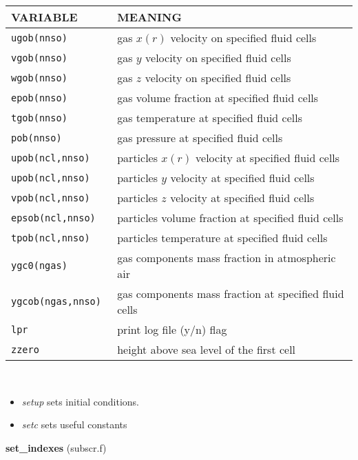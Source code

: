 \begin{tabular}{|p{6cm}|p{6cm}|}\hline
VARIABLE & MEANING\\\hline
\tt ugob(nnso) & gas $x(r)$ velocity on specified fluid cells\\\hline 
\tt vgob(nnso) & gas $y$ velocity on specified fluid cells\\\hline
\tt wgob(nnso) & gas $z$ velocity on specified fluid cells\\\hline
\tt epob(nnso) & gas volume fraction at specified fluid cells\\\hline
\tt  tgob(nnso) & gas temperature at specified fluid cells\\\hline
\tt pob(nnso) & gas pressure at specified fluid cells\\\hline
\tt upob(ncl,nnso) & particles $x(r)$ velocity at specified fluid cells\\\hline
\tt upob(ncl,nnso) & particles $y$ velocity at specified fluid cells\\\hline
\tt vpob(ncl,nnso) & particles $z$ velocity at specified fluid cells\\\hline
\tt epsob(ncl,nnso) & particles volume fraction at specified fluid cells\\\hline
\tt tpob(ncl,nnso) & particles temperature at specified fluid cells\\\hline
\tt ygc0(ngas) & gas components mass fraction in atmospheric air\\\hline
\tt ygcob(ngas,nnso) & gas components mass fraction at specified fluid cells\\\hline
\tt lpr & print log file (y/n) flag\\\hline
\tt zzero & height above sea level of the first cell\\\hline
\end{tabular}\\
\begin{itemize}
\item {\em setup} sets initial conditions.
\item {\em setc} sets useful constants
\end{itemize}
%
%
{\large{\bf set\_indexes}} (subscr.f)\\[5mm]
